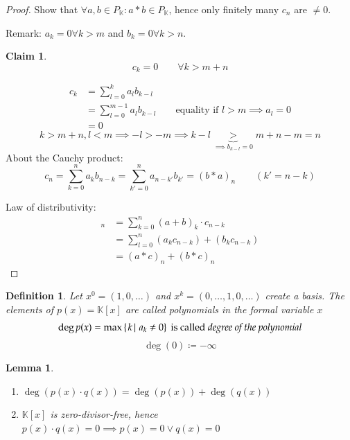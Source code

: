 \documentclass{article}
\newcounter{lecref}[section]
\numberwithin{lecref}{section}
\newtheorem{definition}[lecref]{Definition}
\newtheorem{lemma}[lecref]{Lemma}
\newtheorem*{claim}{Claim}
\newcommand{\setdef}[2]{\left\{\left.#1\,\right|\,#2\right\}}
\begin{document}
\begin{proof}
  Show that $\forall a,b \in P_{\mathbb K}: a * b \in P_{\mathbb K}$, hence only finitely many $c_n$ are $\neq 0$.

  Remark: $a_k = 0 \forall k > m$ and $b_k = 0 \forall k > n$.

  \begin{claim}
    \[ c_k = 0 \qquad \forall k > m + n \]
  \end{claim}

  \begin{align*}
    c_k &= \sum_{l=0}^k a_l b_{k-l} \\
      &= \sum_{l=0}^{m-1} a_l b_{k-l} \qquad \text{equality if $l > m \implies a_l = 0$} \\
      &= 0
  \end{align*}
  \[ k > m + n, l < m \implies -l > -m \implies k - l \underbrace{>}_{\implies b_{k-l} = 0} m + n - m = n \]
  About the Cauchy product:
  \[ c_n = \sum_{k=0}^n a_k b_{n-k} = \sum_{k'=0}^n a_{n-k'} b_{k'} = (b * a)_n \qquad (k' = n - k) \]

  Law of distributivity:
  \begin{align*}
    [(a + b) * c]_n &= \sum_{k=0}^n (a + b)_k \cdot c_{n-k} \\
      &= \sum_{l=0}^n (a_k c_{n-k}) + (b_k c_{n-k}) \\
      &= (a * c)_n + (b * c)_n
  \end{align*}
\end{proof}

\begin{definition} %
  Let $x^0 = (1, 0, \dots)$ and $x^k = (0, \dots, 1, 0, \dots)$ create a basis.
  The elements of $p(x) = \mathbb K[x]$ are called polynomials in the formal variable $x$
  \[ \deg{p(x)} = \max\setdef{k}{a_k \neq 0} \text{ is called \emph{degree of the polynomial}} \]
  \[ \deg(0) \coloneqq -\infty \]
\end{definition}

\begin{lemma}\hfill{} %
  \begin{enumerate}
    \item $\deg(p(x) \cdot q(x)) = \deg(p(x)) + \deg(q(x))$
    \item $\mathbb K[x]$ is zero-divisor-free,
      hence $p(x) \cdot q(x) = 0 \implies p(x) = 0 \lor q(x) = 0$
  \end{enumerate}
\end{lemma}
\end{document}
